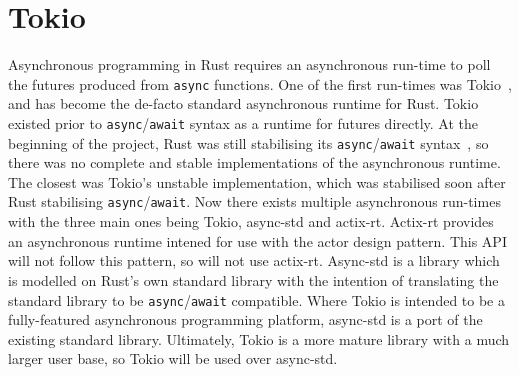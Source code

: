 \newcommand{\asyncawait}{\texttt{async}/\texttt{await}}

\section{Tokio}\label{sec:tokio}
Asynchronous programming in Rust requires an asynchronous run-time to poll the futures produced from \texttt{async}
functions.
One of the first run-times was Tokio~\citep{tokio_community_tokio_nodate}, and has become the de-facto standard
asynchronous runtime for Rust.
Tokio existed prior to \asyncawait{} syntax as a runtime for futures directly.
At the beginning of the project, Rust was still stabilising its \asyncawait{} syntax~\citep{withoutboats_async/await_nodate},
so there was no
complete and stable implementations of the asynchronous runtime.
The closest was Tokio's unstable implementation, which was stabilised soon after Rust stabilising
\asyncawait{}.
Now there exists multiple asynchronous run-times with the three main ones being Tokio, async-std and actix-rt.
Actix-rt provides an asynchronous runtime intened for use with the actor design pattern.
This API will not follow this pattern, so will not use actix-rt.
Async-std is a library which is modelled on Rust's own standard library with the intention of translating the standard
library to be \asyncawait{} compatible.
Where Tokio is intended to be a fully-featured asynchronous programming platform, async-std is a port of the existing
standard library.
Ultimately, Tokio is a more mature library with a much larger user base, so Tokio will be used over async-std.


